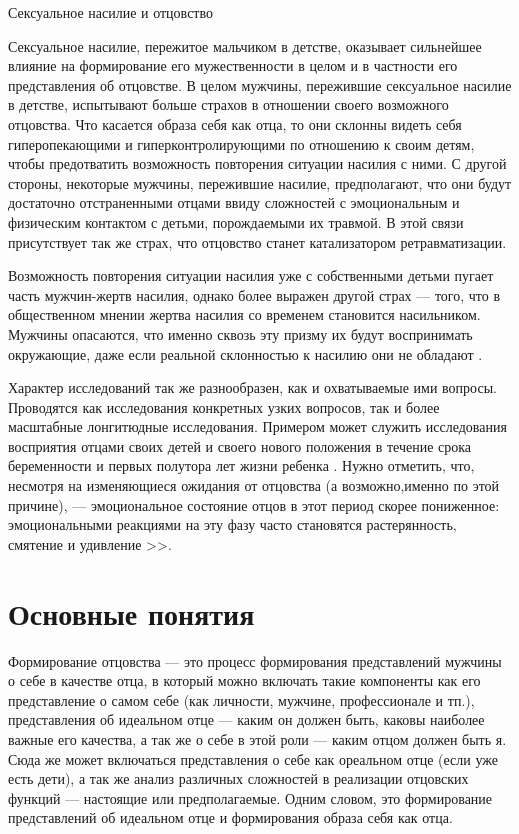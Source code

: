 \documentclass{../../common/thesisbyxetex}
\begin{document}
\cite[164]{long}

Сексуальное насилие и отцовство

Сексуальное насилие, пережитое мальчиком в детстве, оказывает сильнейшее влияние на формирование 
его мужественности в целом и в частности его представления об отцовстве. В целом мужчины, 
пережившие сексуальное насилие в детстве, испытывают больше страхов в отношении своего возможного 
отцовства.  Что касается образа себя как отца, то они склонны видеть себя гиперопекающими  и 
гиперконтролирующими по отношению к своим детям, чтобы предотватить возможность повторения 
ситуации насилия с ними. С другой стороны, некоторые мужчины, пережившие насилие, предполагают, 
что они будут достаточно отстраненными отцами ввиду сложностей с эмоциональным и физическим 
контактом с детьми, порождаемыми их травмой. В этой связи присутствует так же страх, что отцовство 
станет катализатором ретравматизации.

Возможность повторения ситуации насилия уже с собственными детьми пугает часть мужчин-жертв 
насилия, однако более выражен другой страх --- того, что в общественном мнении жертва насилия 
со временем становится насильником. Мужчины опасаются, что именно сквозь эту призму их будут 
воспринимать окружающие, даже если реальной склонностью к насилию они не обладают \cite{sex}. 

Характер исследований так же разнообразен, как и охватываемые ими вопросы. Проводятся как 
исследования конкретных узких вопросов, так и более масштабные лонгитюдные исследования. Примером 
может служить исследования восприятия отцами своих детей и своего нового положения в течение срока 
беременности и первых полутора лет жизни ребенка \cite{percep}. Нужно отметить, что, несмотря на 
изменяющиеся ожидания от отцовства (а возможно,именно по этой причине), --- эмоциональное состояние 
отцов в этот период скорее пониженное: эмоциональными реакциями на эту фазу часто 
становятся растерянность, смятение и удивление \cite[12]{meta}>>.

\section{Основные понятия}

Формирование отцовства --- это процесс формирования представлений мужчины о себе в качестве отца, в 
который можно включать такие компоненты как его представление о самом себе (как личности, мужчине, 
профессионале и тп.), представления об идеальном отце --- каким он должен быть, каковы наиболее 
важные его качества, а так же о себе в этой роли --- каким отцом должен быть я. Сюда же может 
включаться представления о себе как ореальном отце (если уже есть дети), а так же анализ различных 
сложностей в реализации отцовских функций --- настоящие или предполагаемые. 
Одним словом, это формирование представлений об идеальном отце и формирования образа себя как отца.
\end{document}
